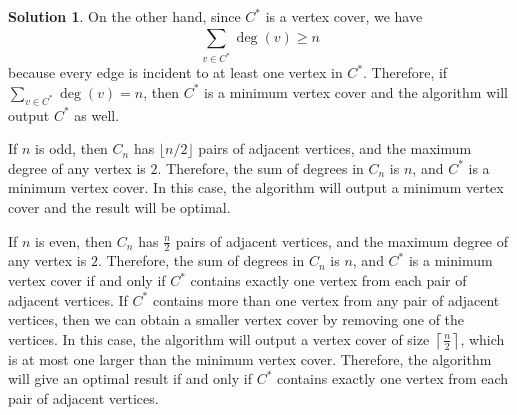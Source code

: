 \documentclass{article}
\theoremstyle{definition}
\newtheorem*{solution}{Solution}
\begin{document}
\begin{solution}
\noindent
On the other hand, since $C^*$ is a vertex cover, we have
\[
\sum_{v\in C^*}^{}\operatorname{deg}(v)\geq n
\]
because every edge is incident to at least one vertex in $C^*$.
Therefore, if $\sum_{v \in C^*} \operatorname{deg}(v) = n$, then $C^*$ is a minimum vertex cover and the algorithm will output $C^*$ as well.

\noindent
If $n$ is odd, then $C_n$ has $\lfloor n/2 \rfloor$ pairs of adjacent vertices, and the maximum degree of any vertex is $2$. Therefore, the sum of degrees in $C_n$ is $n$, and $C^*$ is a minimum vertex cover. In this case, the algorithm will output a minimum vertex cover and the result will be optimal.

\noindent
If $n$ is even, then $C_n$ has $\displaystyle \frac{n}{2}$ pairs of adjacent vertices, and the maximum degree of any vertex is $2$.
Therefore, the sum of degrees in $C_n$ is $n$, and $C^*$ is a minimum vertex cover if and only if $C^*$ contains exactly one vertex from each pair of adjacent vertices.
If $C^*$ contains more than one vertex from any pair of adjacent vertices, then we can obtain a smaller vertex cover by removing one of the vertices.
In this case, the algorithm will output a vertex cover of size $\displaystyle\left\lceil \frac{n}{2} \right\rceil$, which is at most one larger than the minimum vertex cover.
Therefore, the algorithm will give an optimal result if and only if $C^*$ contains exactly one vertex from each pair of adjacent vertices.
\end{solution}
\end{document}
